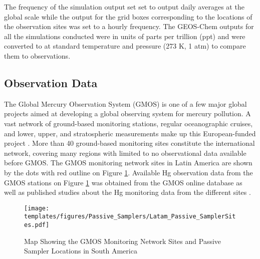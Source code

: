 \begin{flushleft}

 The frequency of the simulation output set set to output daily \hg averages at the global scale while the \hg output for the grid boxes corresponding to the locations of the observation sites was set to a hourly frequency. The GEOS-Chem outputs for all the simulations conducted were in units of parts per trillion (ppt) and were converted to \nang at standard temperature and pressure (273 K, 1 atm) to compare them to observations.
\end{flushleft}

\subsection{Observation Data}


\begin{flushleft}
 The Global Mercury Observation System (GMOS) is one of a few major global projects aimed at developing a global observing system for mercury pollution. A vast network of ground-based monitoring stations, regular oceanographic cruises, and lower, upper, and stratospheric measurements make up this European-funded project \cite{sprovieri_atmospheric_2016} \cite{koenig_seasonal_2021}. More than 40 ground-based monitoring sites constitute the international network, covering many regions with limited to no observational data available before GMOS. The GMOS monitoring network sites in Latin America are shown by the dots with red outline on Figure \ref{fig:GMOS_PAS_stations_map}. Available Hg observation data from the GMOS stations on Figure  \ref{fig:GMOS_PAS_stations_map} was obtained from the GMOS online database as well as published studies about the Hg monitoring data from the different sites \cite{koenig_seasonal_2021}.  
\end{flushleft}
\begin{figure}[H]
  \texttt{[image: templates/figures/Passive\_Samplers/Latam\_Passive\_SamplerSites.pdf]}
  \caption{Map Showing the GMOS Monitoring Network Sites and Passive Sampler Locations in South America}
  \label{fig:GMOS_PAS_stations_map}
  \centering
  
\end{figure}
\FloatBarrier

